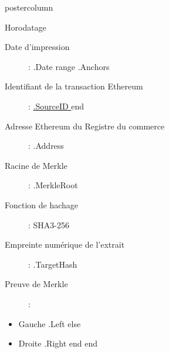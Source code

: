 \documentclass[roundedcorners=true, titleposition=center]{beamerthemeruhuisstijlposter}
\begin{document}
\begin{frame}
\begin{columns}
\begin{column}{0.95\textwidth}
\begin{beamercolorbox}[center, wd=\textwidth]{postercolumn}
\begin{minipage}[T]{0.95\textwidth}
    \hfill
\parbox[t][\columnheight]{\textwidth}{%

\begin{block}{Horodatage}
\begin{description}
\item [Date d'impression] :\linebreak
{{ .Date }}
{{ range .Anchors }}
\item [Identifiant de la transaction Ethereum] :\linebreak
\href{https://etherscan.io/tx/0x{{ .SourceID }} }{ {{.SourceID }} }
{{ end }}
\item[Adresse Ethereum du Registre du commerce] :\linebreak
{{ .Address }}
\item[Racine de Merkle] :\linebreak
{{ .MerkleRoot }}
\item[Fonction de hachage] : \linebreak
SHA3-256
\item[Empreinte numérique de l'extrait] :\linebreak
{{ .TargetHash }}
\item[Preuve de Merkle] :
\end{description}
\begin{itemize}
{{ range .Proof }}
    {{ if .Left }}
        \item Gauche {{ .Left }}
    {{ else }}
        \item Droite {{ .Right }}
    {{ end }}
{{ end }}
\end{itemize}
\end{block}
}
\end{minipage}
\end{beamercolorbox}
\end{column}
\end{columns}
\end{frame}
\end{document}
